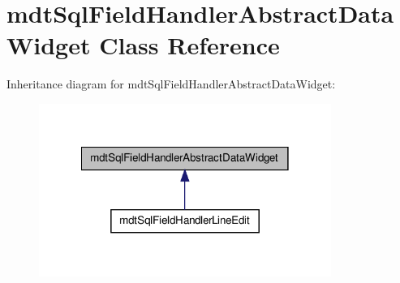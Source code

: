 \hypertarget{classmdt_sql_field_handler_abstract_data_widget}{
\section{mdtSqlFieldHandlerAbstractDataWidget Class Reference}
\label{classmdt_sql_field_handler_abstract_data_widget}
}


Inheritance diagram for mdtSqlFieldHandlerAbstractDataWidget:\nopagebreak
\begin{figure}[H]
\begin{center}
\leavevmode
\includegraphics[width=270pt]{classmdt_sql_field_handler_abstract_data_widget__inherit__graph}
\end{center}
\end{figure}
